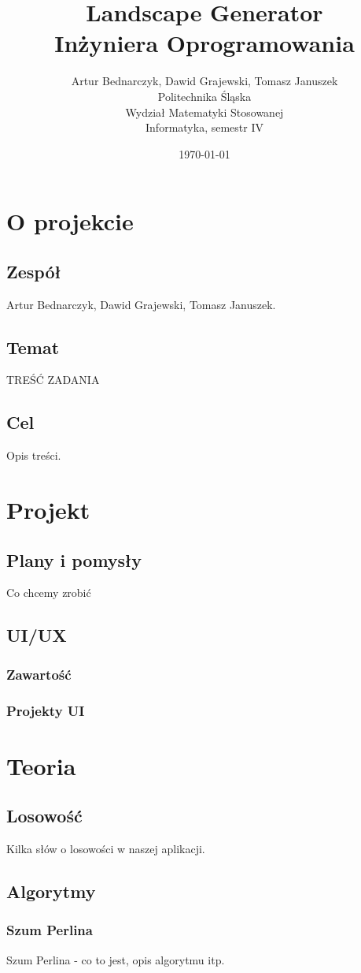 \documentclass[12pt,a4paper]{article}
\title{Landscape Generator\\Inżyniera Oprogramowania}
\author{Artur Bednarczyk, Dawid Grajewski, Tomasz Januszek\\Politechnika Śląska\\Wydział Matematyki Stosowanej\\Informatyka, semestr IV}
\date{\today}
\begin{document}
\maketitle
\newpage
\tableofcontents
\newpage
\section{O projekcie}
\subsection{Zespół}
Artur Bednarczyk, Dawid Grajewski, Tomasz Januszek.
\subsection{Temat}
TREŚĆ ZADANIA
\subsection{Cel}
Opis treści.
\section{Projekt}
\subsection{Plany i pomysły}
Co chcemy zrobić
\subsection{UI/UX}
\subsubsection{Zawartość}
\subsubsection{Projekty UI}
\section{Teoria}
\subsection{Losowość}
Kilka słów o losowości w naszej aplikacji.
\subsection{Algorytmy}
\subsubsection{Szum Perlina}
Szum Perlina - co to jest, opis algorytmu itp.
\end{document}
